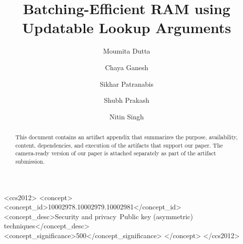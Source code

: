 \documentclass[sigconf]{acmart}
\begin{document}
	
	
	\title{Batching-Efficient RAM using Updatable Lookup Arguments}
	
	
	
	\author{Moumita Dutta}
	
	\author{Chaya Ganesh}
	
	\author{Sikhar Patranabis}
	
	\author{Shubh Prakash}
	
	\author{Nitin Singh}
	
	
	
	
	
	\begin{abstract}		
		This document contains an artifact appendix that summarizes the purpose, availability, content, dependencies, and execution of the artifacts that support our paper. The camera-ready version of our paper is attached separately as part of the artifact submission. 
		
	\end{abstract}
	
	\maketitle
	
	
	
	\begin{CCSXML}
		<ccs2012>
		<concept>
		<concept_id>10002978.10002979.10002981</concept_id>
		<concept_desc>Security and privacy~Public key (asymmetric) techniques</concept_desc>
		<concept_significance>500</concept_significance>
		</concept>
		</ccs2012>
	\end{CCSXML}
	
	
	
	
\end{document}
